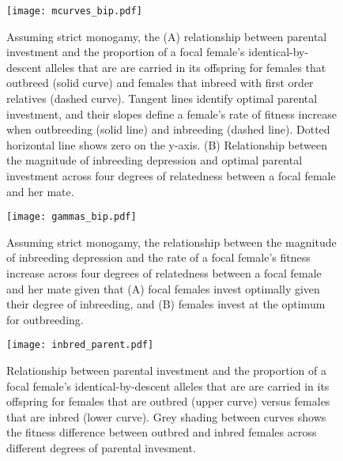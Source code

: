 \documentclass[12pt]{article}
\begin{document}
\clearpage
\begin{figure}
\begin{center}				
\texttt{[image: mcurves\_bip.pdf]}
\end{center}
\caption{Assuming strict monogamy, the (A) relationship between parental investment and the proportion of a focal female's identical-by-descent alleles that are are carried in its offspring for females that outbreed (solid curve) and females that inbreed with first order relatives (dashed curve). Tangent lines identify optimal parental investment, and their slopes define a female's rate of fitness increase when outbreeding (solid line) and inbreeding (dashed line). Dotted horizontal line shows zero on the y-axis. (B) Relationship between the magnitude of inbreeding depression and optimal parental investment across four degrees of relatedness between a focal female and her mate.}
\label{mcurves_bip}
\end{figure}

\clearpage
\begin{figure}
\begin{center}				
\texttt{[image: gammas\_bip.pdf]}
\end{center}
\caption{Assuming strict monogamy, the relationship between the magnitude of inbreeding depression and the rate of a focal female's fitness increase across four degrees of relatedness between a focal female and her mate given that (A) focal females invest optimally given their degree of inbreeding, and (B) females invest at the optimum for outbreeding.}
\label{gammas_bip}
\end{figure}

\clearpage
\begin{figure}
\begin{center}				
\texttt{[image: inbred\_parent.pdf]}
\end{center}
\caption{Relationship between parental investment and the proportion of a focal female's identical-by-descent alleles that are are carried in its offspring for females that are outbred (upper curve) versus females that are inbred (lower curve). Grey shading between curves shows the fitness difference between outbred and inbred females across different degrees of parental invesment.}
\label{inbred_parent}
\end{figure}
\end{document}
